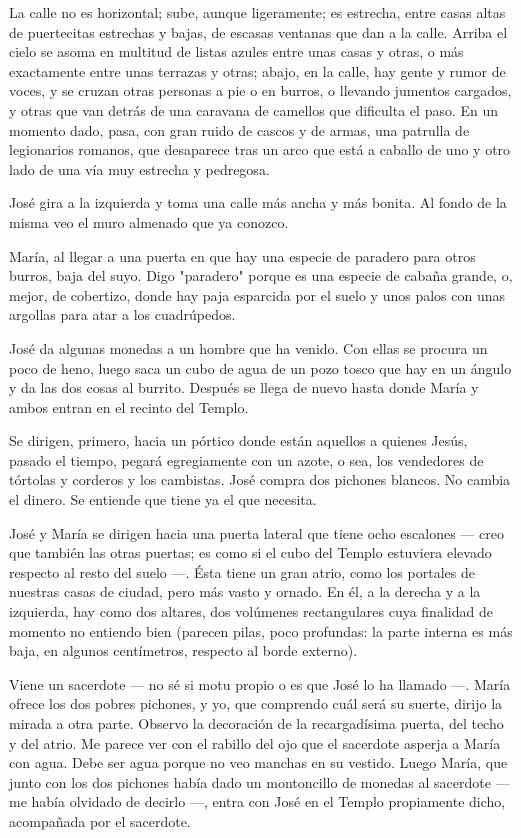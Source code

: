 \documentclass[12pt, twoside, openright]{book} %
\begin{document}
La calle no es horizontal; sube, aunque ligeramente; es estrecha, entre casas altas de puertecitas estrechas y bajas, de escasas ventanas que dan a la calle. Arriba el cielo se asoma en multitud de listas azules entre unas casas y otras, o más exactamente entre unas terrazas y otras; abajo, en la calle, hay gente y rumor de voces, y se cruzan otras personas a pie o en burros, o llevando jumentos cargados, y otras que van detrás de una caravana de camellos que dificulta el paso. En un momento dado, pasa, con gran ruido de cascos y de armas, una patrulla de legionarios romanos, que desaparece tras un arco que está a caballo de uno y otro lado de una vía muy estrecha y pedregosa. 

José gira a la izquierda y toma una calle más ancha y más bonita. Al fondo de la misma veo el muro almenado que ya conozco. 

María, al llegar a una puerta en que hay una especie de paradero para otros burros, baja del suyo. Digo "paradero" porque es una especie de cabaña grande, o, mejor, de cobertizo, donde hay paja esparcida por el suelo y unos palos con unas argollas para atar a los cuadrúpedos. 

José da algunas monedas a un hombre que ha venido. Con ellas se procura un poco de heno, luego saca un cubo de agua de un pozo tosco que hay en un ángulo y da las dos cosas al burrito. Después se llega de nuevo hasta donde María y ambos entran en el recinto del Templo. 

Se dirigen, primero, hacia un pórtico donde están aquellos a quienes Jesús, pasado el tiempo, pegará egregiamente con un azote, o sea, los vendedores de tórtolas y corderos y los cambistas. José compra dos pichones blancos. No cambia el dinero. Se entiende que tiene ya el que necesita. 

José y María se dirigen hacia una puerta lateral que tiene ocho escalones — creo que también las otras puertas; es como si el cubo del Templo estuviera elevado respecto al resto del suelo —. Ésta tiene un gran atrio, como los portales de nuestras casas de ciudad, pero más vasto y ornado. En él, a la derecha y a la izquierda, hay como dos altares, dos volúmenes rectangulares cuya finalidad de momento no entiendo bien (parecen pilas, poco profundas: la parte interna es más baja, en algunos centímetros, respecto al borde externo). 

Viene un sacerdote — no sé si motu propio o es que José lo ha llamado —. María ofrece los dos pobres pichones, y yo, que comprendo cuál será su suerte, dirijo la mirada a otra parte. Observo la decoración de la recargadísima puerta, del techo y del atrio. Me parece ver con el rabillo del ojo que el sacerdote asperja a María con agua. Debe ser agua porque no veo manchas en su vestido. Luego María, que junto con los dos pichones había dado un montoncillo de monedas al sacerdote — me había olvidado de decirlo —, entra con José en el Templo propiamente dicho, acompañada por el sacerdote. 
\end{document}
